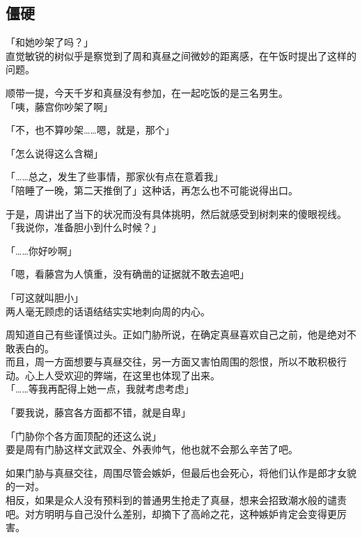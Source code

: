 \subsection{僵硬}

「和她吵架了吗？」\\

直觉敏锐的树似乎是察觉到了周和真昼之间微妙的距离感，在午饭时提出了这样的问题。

顺带一提，今天千岁和真昼没有参加，在一起吃饭的是三名男生。\\

「咦，藤宫你吵架了啊」

「不，也不算吵架……嗯，就是，那个」

「怎么说得这么含糊」

「……总之，发生了些事情，那家伙有点在意着我」\\

「陪睡了一晚，第二天推倒了」这种话，再怎么也不可能说得出口。

于是，周讲出了当下的状况而没有具体挑明，然后就感受到树刺来的傻眼视线。\\

「我说你，准备胆小到什么时候？」

「……你好吵啊」

「嗯，看藤宫为人慎重，没有确凿的证据就不敢去追吧」

「可这就叫胆小」\\

两人毫无顾虑的话语结结实实地刺向周的内心。

周知道自己有些谨慎过头。正如门胁所说，在确定真昼喜欢自己之前，他是绝对不敢表白的。\\

而且，周一方面想要与真昼交往，另一方面又害怕周围的怨恨，所以不敢积极行动。心上人受欢迎的弊端，在这里也体现了出来。\\

「……等我再配得上她一点，我就考虑考虑」

「要我说，藤宫各方面都不错，就是自卑」

「门胁你个各方面顶配的还这么说」\\

要是周有门胁这样文武双全、外表帅气，他也就不会那么辛苦了吧。

如果门胁与真昼交往，周围尽管会嫉妒，但最后也会死心，将他们认作是郎才女貌的一对。\\

相反，如果是众人没有预料到的普通男生抢走了真昼，想来会招致潮水般的谴责吧。对方明明与自己没什么差别，却摘下了高岭之花，这种嫉妒肯定会变得更厉害。\\

